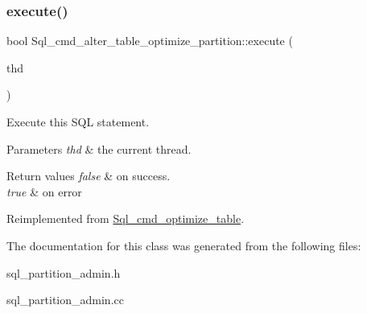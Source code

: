 \subsubsection{\texorpdfstring{execute()}{execute()}}
{\footnotesize\ttfamily bool Sql\+\_\+cmd\+\_\+alter\+\_\+table\+\_\+optimize\+\_\+partition\+::execute (\begin{DoxyParamCaption}\item[{T\+HD $\ast$}]{thd }\end{DoxyParamCaption})\hspace{0.3cm}{\ttfamily [virtual]}}

Execute this S\+QL statement. 
\begin{DoxyParams}{Parameters}
{\em thd} & the current thread. \\
\hline
\end{DoxyParams}

\begin{DoxyRetVals}{Return values}
{\em false} & on success. \\
\hline
{\em true} & on error \\
\hline
\end{DoxyRetVals}


Reimplemented from \mbox{\hyperlink{classSql__cmd__optimize__table_a91077d83c5c27dae2f78a4b47c8f06a3}{Sql\+\_\+cmd\+\_\+optimize\+\_\+table}}.



The documentation for this class was generated from the following files\+:\begin{DoxyCompactItemize}
\item 
sql\+\_\+partition\+\_\+admin.\+h\item 
sql\+\_\+partition\+\_\+admin.\+cc\end{DoxyCompactItemize}
